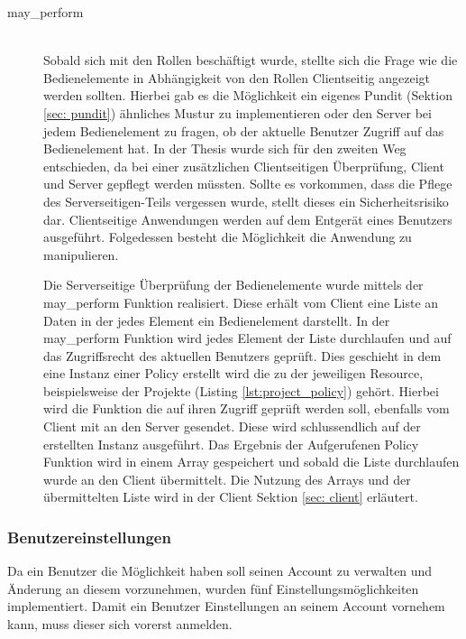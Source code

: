 \documentclass[paper=a4,fontsize=12pt,parskip=half]{scrartcl}
\begin{document}
	\begin{description}
		\item[may\_perform]\hfill\\
		Sobald sich mit den Rollen beschäftigt wurde, stellte sich die Frage wie die Bedienelemente in Abhängigkeit von den Rollen Clientseitig angezeigt werden sollten. Hierbei gab es die Möglichkeit ein eigenes Pundit (Sektion \ref{sec: pundit}) ähnliches Mustur zu implementieren oder den Server bei jedem Bedienelement zu fragen, ob der aktuelle Benutzer Zugriff auf das Bedienelement hat. In der Thesis wurde sich für den zweiten Weg entschieden, da bei einer zusätzlichen Clientseitigen Überprüfung, Client und Server gepflegt werden müssten. Sollte es vorkommen, dass die Pflege des Serverseitigen-Teils vergessen wurde, stellt dieses ein Sicherheitsrisiko dar. Clientseitige Anwendungen werden auf dem Entgerät eines Benutzers ausgeführt. Folgedessen besteht die Möglichkeit die Anwendung zu manipulieren. 
		
		Die Serverseitige Überprüfung der Bedienelemente wurde mittels der may\_perform Funktion realisiert. Diese erhält vom Client eine Liste an Daten in der jedes Element ein Bedienelement darstellt. In der may\_perform Funktion wird jedes Element der Liste durchlaufen und auf das Zugriffsrecht des aktuellen Benutzers geprüft. Dies geschieht in dem eine Instanz einer Policy erstellt wird die zu der jeweiligen Resource, beispielsweise der Projekte (Listing \ref{lst:project_policy}) gehört. Hierbei wird die Funktion die auf ihren Zugriff geprüft werden soll, ebenfalls vom Client mit an den Server gesendet. Diese wird schlussendlich auf der erstellten Instanz ausgeführt. Das Ergebnis der Aufgerufenen Policy Funktion wird in einem Array gespeichert und sobald die Liste durchlaufen wurde an den Client übermittelt. Die Nutzung des Arrays und der übermittelten Liste wird in der Client Sektion \ref{sec: client} erläutert.
	\end{description}

	\subsubsection{Benutzereinstellungen}
	Da ein Benutzer die Möglichkeit haben soll seinen Account zu verwalten und Änderung an diesem vorzunehmen, wurden fünf Einstellungsmöglichkeiten implementiert. Damit ein Benutzer Einstellungen an seinem Account vornehem kann, muss dieser sich vorerst anmelden.
	
\end{document}
